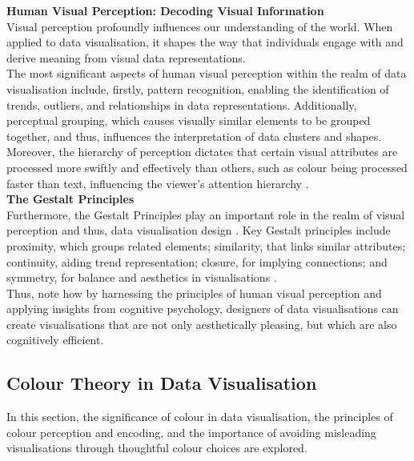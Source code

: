 \documentclass{article}\usepackage[]{graphicx}\usepackage[]{xcolor}
\numberwithin{equation}{section}
\begin{document}
\noindent \textbf{Human Visual Perception: Decoding Visual Information}\\
Visual perception profoundly influences our understanding of the world. When applied to data visualisation, it shapes the way that individuals engage with and derive meaning from visual data representations.\\

\noindent 
The most significant aspects of human visual perception within the realm of data visualisation include, firstly, pattern recognition, enabling the identification of trends, outliers, and relationships in data representations. Additionally, perceptual grouping, which causes visually similar elements to be grouped together, and thus, influences the interpretation of data clusters and shapes. Moreover, the hierarchy of perception dictates that certain visual attributes are processed more swiftly and effectively than others, such as colour being processed faster than text, influencing the viewer's attention hierarchy \cite{dastani2002role, ward2010interactive}.\\

\noindent \textbf{The Gestalt Principles }\\
Furthermore, the Gestalt Principles play an important role in the realm of visual perception and thus, data visualisation design \cite{rosli2015gestalt}. Key Gestalt principles include proximity, which groups related elements; similarity, that links similar attributes; continuity, aiding trend representation; closure, for implying connections; and symmetry, for balance and aesthetics in visualisations \cite{todorovic2008gestalt}. \\

\noindent Thus, note how by harnessing the principles of human visual perception and applying insights from cognitive psychology, designers of data visualisations can create visualisations that are not only aesthetically pleasing, but which are also cognitively efficient.	

\subsection{Colour Theory in Data Visualisation}
In this section, the significance of colour in data visualisation, the principles of colour perception and encoding, and the importance of avoiding misleading visualisations through thoughtful colour choices are explored.\\
\end{document}
